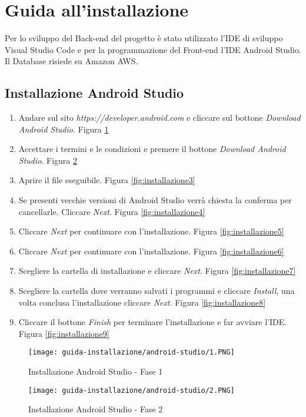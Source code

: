 \section{Guida all'installazione}
Per lo sviluppo del Back-end del progetto è stato utilizzato l'IDE di sviluppo Visual Studio Code e per la programmazione del Front-end l'IDE Android Studio. Il Database risiede su Amazon AWS. 
\subsection{Installazione Android Studio}
\begin{enumerate}
    \item Andare sul sito \textit{https://developer.android.com} e cliccare sul bottone \textit{Download Android Studio}. Figura \ref{fig:installazione1}
    \item Accettare i termini e le condizioni e premere il bottone \textit{Download Android Studio}. Figura \ref{fig:installazione2}
    \item Aprire il file eseguibile. Figura \ref{fig:installazione3}
    \item Se presenti vecchie versioni di Android Studio verrà chiesta la conferma per cancellarle. Cliccare \textit{Next}. Figura \ref{fig:installazione4}
    \item Cliccare \textit{Next} per continuare con l'installazione. Figura \ref{fig:installazione5}
     \item Cliccare \textit{Next} per continuare con l'installazione. Figura \ref{fig:installazione6}
     \item Scegliere la cartella di installazione e cliccare \textit{Next}. Figura \ref{fig:installazione7} 
     \item Scegliere la cartella dove verranno salvati i programmi e cliccare  \textit{Install}, una volta conclusa l'installazione cliccare  \textit{Next}. Figura \ref{fig:installazione8} 
     \item Cliccare il bottone  \textit{Finish} per terminare l'installazione e far avviare l'IDE. Figura \ref{fig:installazione9}
\end{enumerate}

\begin{figure}[htbp]
    \texttt{[image: guida-installazione/android-studio/1.PNG]}
    \centering
    \caption{Installazione Android Studio - Fase 1}
    \label{fig:installazione1}
\end{figure}

\begin{figure}[htbp]
    \texttt{[image: guida-installazione/android-studio/2.PNG]}
    \centering
    \caption{Installazione Android Studio - Fase 2}
    \label{fig:installazione2}
\end{figure}

